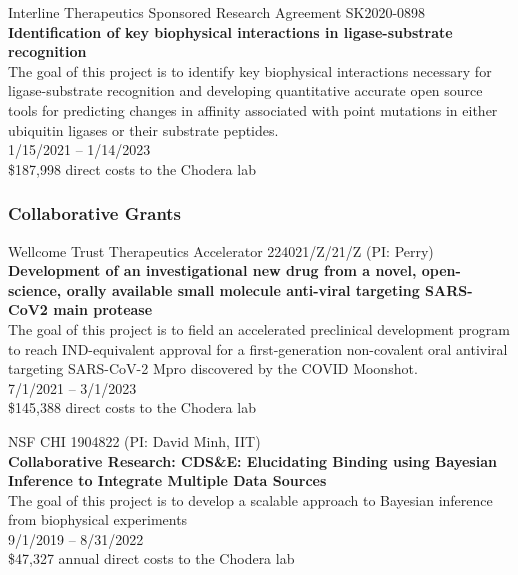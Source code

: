 \documentclass[10pt]{article}
\begin{document}
\vspace{1.5ex}

Interline Therapeutics Sponsored Research Agreement SK2020-0898 \\
{\bf Identification of key biophysical interactions in ligase-substrate recognition} \\
The goal of this project is to identify key biophysical interactions necessary for ligase-substrate recognition and developing quantitative accurate open source tools for predicting changes in affinity associated with point mutations in either ubiquitin ligases or their substrate peptides. \\
1/15/2021 -- 1/14/2023\\
\$187,998 direct costs to the Chodera lab



\subsubsection*{Collaborative Grants}

Wellcome Trust Therapeutics Accelerator 224021/Z/21/Z (PI: Perry) \\
{\bf Development of an investigational new drug from a novel, open-science, orally available small molecule anti-viral targeting SARS-CoV2 main protease}\\
The goal of this project is to field an accelerated preclinical development program to reach IND-equivalent approval for a first-generation non-covalent oral antiviral targeting SARS-CoV-2 Mpro discovered by the COVID Moonshot. \\
7/1/2021 -- 3/1/2023\\
\$145,388 direct costs to the Chodera lab

\vspace{1.5ex}

NSF CHI 1904822 (PI: David Minh, IIT) \\
{\bf Collaborative Research: CDS\&E: Elucidating Binding using Bayesian Inference to Integrate Multiple Data Sources}\\
The goal of this project is to develop a scalable approach to Bayesian inference from biophysical experiments\\
9/1/2019 -- 8/31/2022\\
\$47,327 annual direct costs to the Chodera lab

\vspace{1.5ex}
\end{document}
